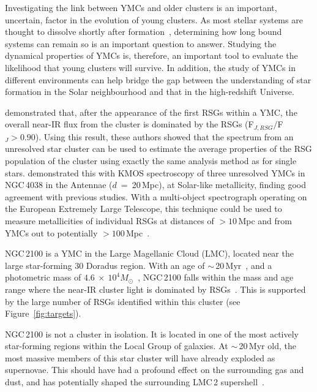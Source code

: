 Investigating the link between YMCs and older clusters is an important, uncertain, factor in the evolution of young clusters.
As most stellar systems are thought to dissolve shortly after formation~\citep{2003ARA&A..41...57L}, determining how long bound systems can remain so is an important question to answer.
Studying the dynamical properties of YMCs is, therefore, an important tool to evaluate the likelihood that young clusters will survive.
In addition, the study of YMCs in different environments can help bridge the gap between the understanding of star formation in the Solar neighbourhood and that in the high-redshift Universe.

\citet{2013MNRAS.430L..35G} demonstrated that, after the appearance of the first RSGs within a YMC, the overall near-IR flux from the cluster is dominated by the RSGs (F$_{J, RSG}/$F$_{J}>0.90$).
Using this result, these authors showed that the spectrum from an unresolved star cluster can be used to estimate the average properties of the RSG population of the cluster using exactly the same analysis method as for single stars.
\citet{2015ApJ...812..160L} demonstrated this with KMOS spectroscopy of three unresolved YMCs in NGC\,4038 in the Antennae ($d$~=~20\,Mpc), at Solar-like metallicity, finding good agreement with previous studies.
With a multi-object spectrograph operating on the European Extremely Large Telescope, this technique could be used to measure metallicities of individual RSGs at distances of $>10\,$Mpc and from YMCs out to potentially $>100\,$Mpc~\citep{2011A&A...527A..50E}.

NGC\,2100 is a YMC in the Large Magellanic Cloud (LMC), located near the large star-forming 30 Doradus region.
With an age of $\sim$\,20\,Myr~\citep{1991ApJS...76..185E,2015A&A...575A..62N}, and a photometric mass of $4.6~\times~10^4M_{\odot}$~\citep[assuming~\cite{1966AJ.....71...64K} profiles]{2005ApJS..161..304M}, NGC\,2100 falls within the mass and age range where the near-IR cluster light is dominated by RSGs~\citep{2013MNRAS.430L..35G}.
This is supported by the large number of RSGs identified within this cluster (see Figure~\ref{fig:targets}).

NGC\,2100 is not a cluster in isolation.
It is located in one of the most actively star-forming regions within the Local Group of galaxies.
At $\sim$\,20\,Myr old, the most massive members of this star cluster will have already exploded as supernovae.
This should have had a profound effect on the surrounding gas and dust, and has potentially shaped the surrounding LMC\,2 supershell~\citep[see][]{1999ApJ...518..298P}.

